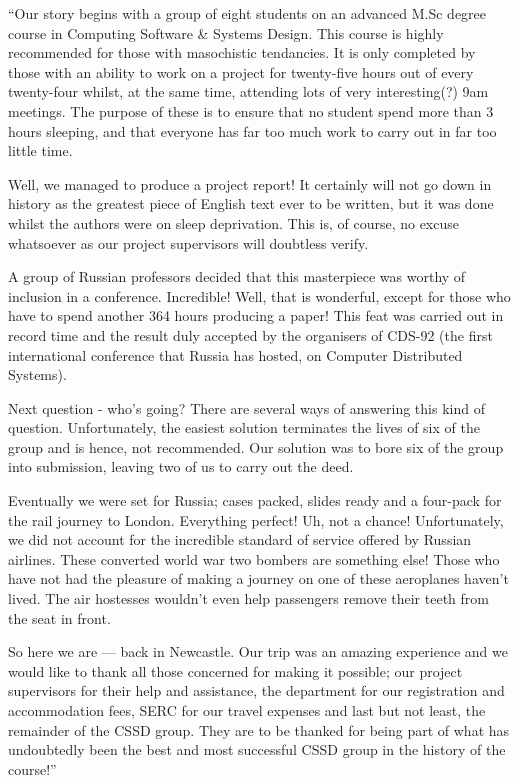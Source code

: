  \doublecolumns

 ``Our story begins with a group of eight students on an advanced
 M.Sc degree course in Computing Software \& Systems Design.  This
 course is highly recommended for those with masochistic tendancies.
 It is only completed by those with an ability to work on a project
 for twenty-five hours out of every twenty-four whilst, at the same
 time, attending lots of very interesting(?) 9am meetings.  The
 purpose of these is to ensure that no student spend more than 3
 hours sleeping, and that everyone has far too much work to carry out
 in far too little time.

    Well, we managed to produce a project report!  It certainly will
 not go down in history as the greatest piece of English text ever to
 be written, but it was done whilst the authors were on sleep
 deprivation.  This is, of course, no excuse whatsoever as our
 project supervisors will doubtless verify.

    A group of Russian professors decided that this masterpiece was
 worthy of inclusion in a conference.  Incredible!  Well, that is
 wonderful, except for those who have to spend another 364 hours
 producing a paper!  This feat was carried out in record time and the
 result duly accepted by the organisers of CDS-92 (the first
 international conference that Russia has hosted, on Computer
 Distributed Systems).

    Next question - who's going?  There are several ways of answering
 this kind of question.  Unfortunately, the easiest solution
 terminates the lives of six of the group and is hence, not
 recommended.  Our solution was to bore six of the group into
 submission, leaving two of us to carry out the deed.

    Eventually we were set for Russia; cases packed, slides ready and
 a four-pack for the rail journey to London.  Everything perfect!
 Uh, not a chance!  Unfortunately, we did not account for the
 incredible standard of service offered by Russian airlines.  These
 converted world war two bombers are something else!  Those who have
 not had the pleasure of making a journey on one of these aeroplanes
 haven't lived.  The air hostesses wouldn't even help passengers
 remove their teeth from the seat in front.


    So here we are --- back in Newcastle.  Our trip was an amazing
 experience and we would like to thank all those concerned for making
 it possible; our project supervisors for their help and assistance,
 the department for our registration and accommodation fees, SERC for
 our travel expenses and last but not least, the remainder of the
 CSSD group.  They are to be thanked for being part of what has
 undoubtedly been the best and most successful CSSD group in the
 history of the course!''

